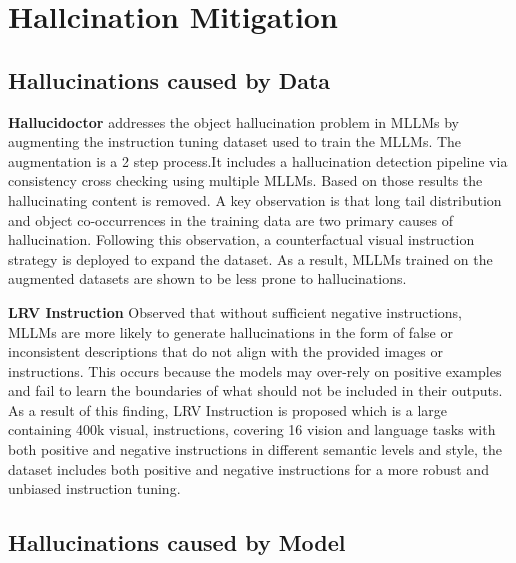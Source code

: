 \documentclass[twocolumn, 9pt]{extarticle}
\begin{document}
\section{Hallcination Mitigation}
\subsection{Hallucinations caused by Data}

\textbf{Hallucidoctor}  addresses the object hallucination problem in MLLMs by augmenting the instruction tuning dataset used to train the MLLMs. The augmentation is a 2 step process.It includes a hallucination detection pipeline via consistency cross checking using multiple MLLMs. Based on those results the hallucinating content is removed. A key observation is that long tail distribution and object co-occurrences in the training data are two primary causes of hallucination. Following this observation, a counterfactual visual instruction strategy is deployed to expand the dataset. As a result, MLLMs trained on the augmented datasets are shown to be less prone to hallucinations.




\textbf{LRV Instruction} 
Observed that without sufficient negative instructions, MLLMs are more likely to generate hallucinations in the form of false or inconsistent descriptions that do not align with the provided images or instructions. This occurs because the models may over-rely on positive examples and fail to learn the boundaries of what should not be included in their outputs. As a result of this finding, LRV Instruction is proposed which is a large containing 400k visual, instructions, covering 16 vision and language tasks with both positive and negative instructions in different semantic levels and style, the dataset includes both positive and negative instructions for a more robust and unbiased instruction tuning. 

\subsection{Hallucinations caused by Model}
\end{document}
